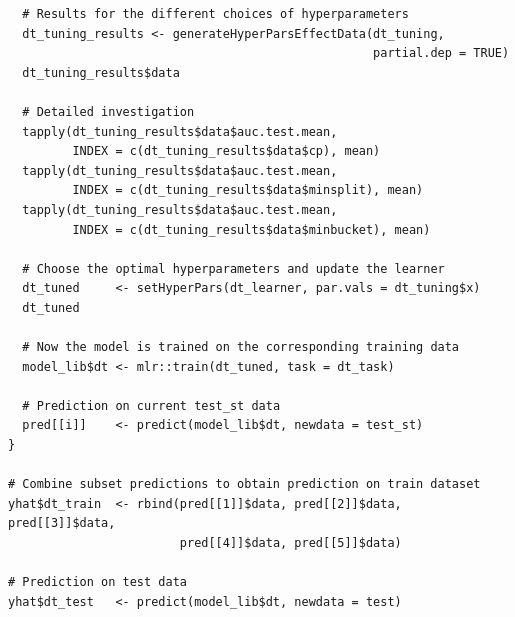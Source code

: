 \documentclass[12pt]{article}
\begin{document}
\begin{lstlisting}
  # Results for the different choices of hyperparameters
  dt_tuning_results <- generateHyperParsEffectData(dt_tuning, 
                                                   partial.dep = TRUE)
  dt_tuning_results$data
  
  # Detailed investigation
  tapply(dt_tuning_results$data$auc.test.mean, 
         INDEX = c(dt_tuning_results$data$cp), mean)
  tapply(dt_tuning_results$data$auc.test.mean, 
         INDEX = c(dt_tuning_results$data$minsplit), mean)
  tapply(dt_tuning_results$data$auc.test.mean, 
         INDEX = c(dt_tuning_results$data$minbucket), mean)
  
  # Choose the optimal hyperparameters and update the learner
  dt_tuned     <- setHyperPars(dt_learner, par.vals = dt_tuning$x)
  dt_tuned
  
  # Now the model is trained on the corresponding training data 
  model_lib$dt <- mlr::train(dt_tuned, task = dt_task)
  
  # Prediction on current test_st data
  pred[[i]]    <- predict(model_lib$dt, newdata = test_st)
}

# Combine subset predictions to obtain prediction on train dataset
yhat$dt_train  <- rbind(pred[[1]]$data, pred[[2]]$data, pred[[3]]$data, 
                        pred[[4]]$data, pred[[5]]$data)

# Prediction on test data 
yhat$dt_test   <- predict(model_lib$dt, newdata = test)
\end{lstlisting}
\end{document}
